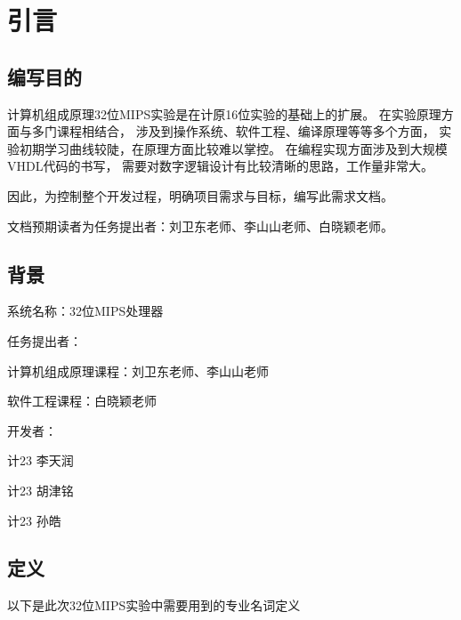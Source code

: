 \section{引言}
    \subsection{编写目的}
        计算机组成原理32位MIPS实验是在计原16位实验的基础上的扩展。%
        在实验原理方面与多门课程相结合，%
        涉及到操作系统、软件工程、编译原理等等多个方面，%
        实验初期学习曲线较陡，在原理方面比较难以掌控。%
        在编程实现方面涉及到大规模VHDL代码的书写，%
        需要对数字逻辑设计有比较清晰的思路，工作量非常大。

        因此，为控制整个开发过程，明确项目需求与目标，编写此需求文档。 

        文档预期读者为任务提出者：刘卫东老师、李山山老师、白晓颖老师。
    \subsection{背景}
        系统名称：32位MIPS处理器

        任务提出者：
        \begin{minipage}[t]{0.8\linewidth}
        计算机组成原理课程：刘卫东老师、李山山老师

        软件工程课程：白晓颖老师
        \end{minipage}
        

        开发者：
        \begin{minipage}[t]{0.8\linewidth}
        计23 李天润

        计23 胡津铭

        计23 孙皓
        \end{minipage}

    \subsection{定义}
        以下是此次32位MIPS实验中需要用到的专业名词定义

